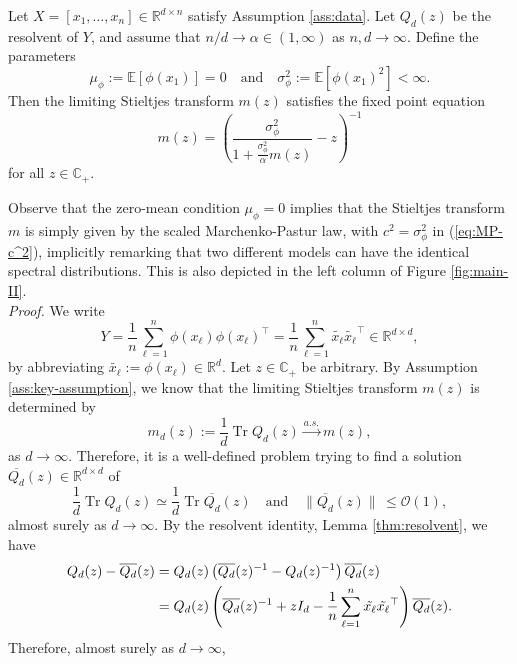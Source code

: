 \documentclass{article}
\begin{document}
\begin{theorem}\label{thm:mainresult-2}
Let $X=[x_1,\dots,x_n]\in\mathbb{R}^{d\times n}$ satisfy Assumption \ref{ass:data}. Let $Q_{d}(z)$ be the resolvent of $Y$, and assume that $n/d\to\alpha\in(1,\infty)$ as $n,d\to\infty$. Define the parameters 
$$\mu_\phi:=\mathbb{E}[\phi(x_1)]=0\quad\text{and}\quad \sigma_\phi^2:=\mathbb{E}[\phi(x_1)^2]<\infty.$$
Then the limiting Stieltjes transform $m(z)$ satisfies the fixed point equation
$$m(z)=\left(\frac{\sigma_\phi^2}{1+\frac{\sigma_\phi^2}{\alpha}m(z)}-z\right)^{-1}$$
for all $z\in\mathbb{C}_+$.
\end{theorem}
\bigskip
\par
Observe that the zero-mean condition $\mu_\phi=0$ implies that the Stieltjes transform $m$ is simply given by the scaled Marchenko-Pastur law, with $c^2=\sigma_\phi^2$ in (\ref{eq:MP-c^2}), implicitly remarking that two different models can have the identical spectral distributions. This is also depicted in the left column of Figure \ref{fig:main-II}.
\bigskip
\\
\emph{Proof.} We write
\begin{equation}
Y=\frac{1}{n}\sum_{\ell=1}^n\phi(x_\ell)\phi(x_\ell)^\top=\frac{1}{n}\sum_{\ell=1}^n\tilde{x_\ell}\tilde{x_\ell}^\top\in\mathbb{R}^{d\times d},
\end{equation}
by abbreviating $\tilde{x_\ell}:=\phi(x_\ell)\in\mathbb{R}^{d}$. Let $z\in\mathbb{C}_+$ be arbitrary. By Assumption \ref{ass:key-assumption}, we know that the limiting Stieltjes transform $m(z)$ is determined by
$$m_d(z):=\frac{1}{d}\operatorname{Tr}Q_d(z)\stackrel{a.s.}{\to}m(z),$$
as $d\to\infty$. Therefore, it is a well-defined problem trying to find a solution $\overline{Q_d}(z)\in\mathbb{R}^{d\times d}$ of
\begin{equation}
\frac{1}{d}\operatorname{Tr}Q_d(z)\simeq\frac{1}{d}\operatorname{Tr}\overline{Q_d}(z)\quad\text{and}\quad\|\overline{Q_d}(z)\|\,\leq\mathcal{O}(1),
\end{equation}
almost surely as $d\to\infty$.
By the resolvent identity, Lemma \ref{thm:resolvent}, we have
\begin{align}
Q_{d}(z)-\overline{Q_{d}}(z) &= Q_{d}(z)\left(\overline{Q_{d}}(z)^{-1}-Q_{d}(z)^{-1}\right)\overline{Q_{d}}(z) \notag
\\ &= Q_{d}(z)\left(\overline{Q_{d}}(z)^{-1}+zI_{d}-\frac{1}{n}\sum_{\ell=1}^n\tilde{x_\ell}\tilde{x_\ell}^\top\right)\overline{Q_{d}}(z).
\end{align}
Therefore, almost surely as $d\to\infty$,
\end{document}
